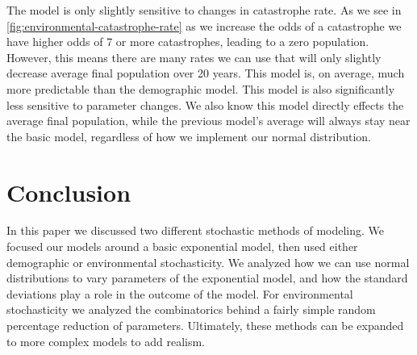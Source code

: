 \documentclass{article}
\begin{document}
The model is only slightly sensitive to changes in catastrophe rate. As we see in \cref{fig:environmental-catastrophe-rate} as we increase the odds of a catastrophe we have higher odds of 7 or more catastrophes, leading to a zero population. However, this means there are many rates we can use that will only slightly decrease average final population over 20 years. This model is, on average, much more predictable than the demographic model. This model is also significantly less sensitive to parameter changes. We also know this model directly effects the average final population, while the previous model's average will always stay near the basic model, regardless of how we implement our normal distribution.

\section{Conclusion}

In this paper we discussed two different stochastic methods of modeling. We focused our models around a basic exponential model, then used either demographic or environmental stochasticity. We analyzed how we can use normal distributions to vary parameters of the exponential model, and how the standard deviations play a role in the outcome of the model. For environmental stochasticity we analyzed the combinatorics behind a fairly simple random percentage reduction of parameters. Ultimately, these methods can be expanded to more complex models to add realism.
\end{document}
